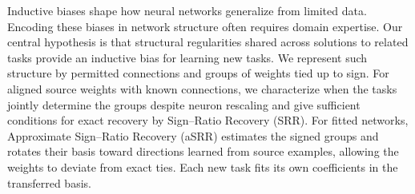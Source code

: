 Inductive biases shape how neural networks generalize from limited
data. Encoding these biases in network structure often requires domain
expertise. Our central hypothesis is that structural regularities shared
across solutions to related tasks provide an inductive bias for learning
new tasks. We represent such structure by permitted connections and
groups of weights tied up to sign. For aligned source weights with
known connections, we characterize when the tasks jointly determine
the groups despite neuron rescaling and give sufficient conditions for
exact recovery by Sign--Ratio Recovery (SRR). For fitted networks,
Approximate Sign--Ratio Recovery (aSRR) estimates the signed groups and
rotates their basis toward directions learned from source examples,
allowing the weights to deviate from exact ties. Each new task fits its
own coefficients in the transferred basis.
